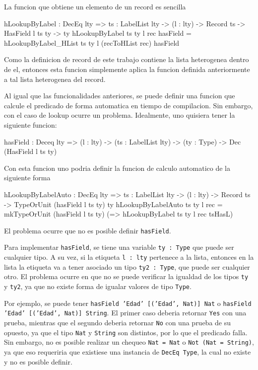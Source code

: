 La funcion que obtiene un elemento de un record es sencilla

\begin{code}
hLookupByLabel : DecEq lty => {ts : LabelList lty} -> 
  (l : lty) -> Record ts -> HasField l ts ty -> ty
hLookupByLabel {ts} {ty} l rec hasField = 
  hLookupByLabel_HList {ts} {ty} l (recToHList rec) hasField
\end{code}

Como la definicion de record de este trabajo contiene la lista heterogenea dentro de el, entonces esta funcion simplemente aplica la funcion definida anteriormente a tal lista heterogenea del record.

Al igual que las funcionalidades anteriores, se puede definir una funcion que calcule el predicado de forma automatica en tiempo de compilacion. Sin embargo, con el caso de lookup ocurre un problema. Idealmente, uno quisiera tener la siguiente funcion:

\begin{code}
hasField : Deceq lty => (l : lty) -> 
  (ts : LabelList lty) -> (ty : Type) -> 
  Dec (HasField l ts ty)
\end{code}

Con esta funcion uno podria definir la funcion de calculo automatico de la siguiente forma

\begin{code}
hLookupByLabelAuto : DecEq lty => {ts : LabelList lty} ->
  (l : lty) -> Record ts -> 
  TypeOrUnit (hasField l ts ty) ty
hLookupByLabelAuto {ts} {ty} l rec = 
  mkTypeOrUnit (hasField l ts ty) 
  (\tsHasL => hLookupByLabel {ts} {ty} l rec tsHasL)
\end{code}

El problema ocurre que no es posible definir \texttt{hasField}.

Para implementar \texttt{hasField}, se tiene una variable \texttt{ty : Type} que puede ser cualquier tipo. A su vez, si la etiqueta \texttt{l : lty} pertenece a la lista, entonces en la lista la etiqueta va a tener asociado un tipo \texttt{ty2 : Type}, que puede ser cualquier otro. El problema ocurre en que no se puede verificar la igualdad de los tipos \texttt{ty} y \texttt{ty2}, ya que no existe forma de igualar valores de tipo \texttt{Type}.

Por ejemplo, se puede tener \texttt{hasField 'Edad' [('Edad', Nat)] Nat} o \texttt{hasField 'Edad' [('Edad', Nat)] String}. El primer caso deberia retornar \texttt{Yes} con una prueba, mientras que el segundo deberia retornar \texttt{No} con una prueba de su opuesto, ya que el tipo \texttt{Nat} y \texttt{String} son distintos, por lo que el predicado falla. Sin embargo, no es posible realizar un chequeo \texttt{Nat = Nat} o \texttt{Not (Nat = String)}, ya que eso requeriria que existiese una instancia de \texttt{DecEq Type}, la cual no existe y no es posible definir.


